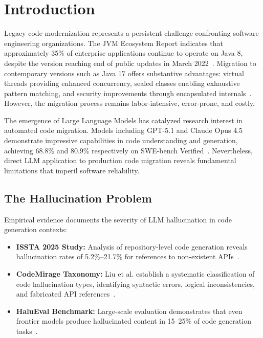 \documentclass[10pt,conference]{IEEEtran}
\begin{document}
\section{Introduction}

Legacy code modernization represents a persistent challenge confronting software engineering organizations. The JVM Ecosystem Report indicates that approximately 35\% of enterprise applications continue to operate on Java 8, despite the version reaching end of public updates in March 2022~\cite{snyk2023}. Migration to contemporary versions such as Java 17 offers substantive advantages: virtual threads providing enhanced concurrency, sealed classes enabling exhaustive pattern matching, and security improvements through encapsulated internals~\cite{oracle2023}. However, the migration process remains labor-intensive, error-prone, and costly.

The emergence of Large Language Models has catalyzed research interest in automated code migration. Models including GPT-5.1 and Claude Opus 4.5 demonstrate impressive capabilities in code understanding and generation, achieving 68.8\% and 80.9\% respectively on SWE-bench Verified~\cite{swebench2025}. Nevertheless, direct LLM application to production code migration reveals fundamental limitations that imperil software reliability.

\subsection{The Hallucination Problem}

Empirical evidence documents the severity of LLM hallucination in code generation contexts:

\begin{itemize}
    \item \textbf{ISSTA 2025 Study:} Analysis of repository-level code generation reveals hallucination rates of 5.2\%--21.7\% for references to non-existent APIs~\cite{zhang2025}.
    \item \textbf{CodeMirage Taxonomy:} Liu et al. establish a systematic classification of code hallucination types, identifying syntactic errors, logical inconsistencies, and fabricated API references~\cite{liu2024}.
    \item \textbf{HaluEval Benchmark:} Large-scale evaluation demonstrates that even frontier models produce hallucinated content in 15--25\% of code generation tasks~\cite{li2023}.
\end{itemize}
\end{document}
